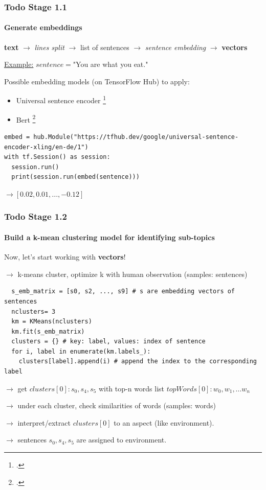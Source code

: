 \documentclass{tum-presentation}
\begin{document}
\begin{frame}[fragile]
  \frametitle{Todo Stage 1.1}
  \framesubtitle{Generate embeddings }

  \begin{description}
    \item \textbf{text}  $\to$ \textit{lines split}  $\to$ list of sentences $\to$ \textit{sentence embedding}  $\to$ \textbf{vectors}
   
    \pause 
    \vspace{0.2cm}
    \item \underline{Example:} $sentence=$"You are what you eat." 
    \vspace{0.2cm}
    \pause 
    \item Possible embedding models (on TensorFlow Hub) to apply:
    \begin{itemize}
      \item  Universal sentence encoder \footcite{chidambaram2018learning}
      \item  Bert \footcite{bertontfhub}
    \end{itemize}
    \pause 
  \begin{lstlisting}
embed = hub.Module("https://tfhub.dev/google/universal-sentence-encoder-xling/en-de/1")
with tf.Session() as session:
  session.run()
  print(session.run(embed(sentence)))
    \end{lstlisting}
    \item $ \to [0.02, 0.01, ..., -0.12]$
  \end{description}
\end{frame}

\begin{frame}[fragile]
  \frametitle{Todo Stage 1.2}
 \framesubtitle{Build a k-mean clustering model for identifying sub-topics}
 \begin{description}
  \item Now, let's start working with \textbf{vectors}! 

  \item $\to$ k-means cluster, optimize k with human observation \alert{(samples: sentences)}
  \pause 
  \begin{lstlisting}
  s_emb_matrix = [s0, s2, ..., s9] # s are embedding vectors of sentences
  nclusters= 3
  km = KMeans(nclusters)
  km.fit(s_emb_matrix)
  clusters = {} # key: label, values: index of sentence
  for i, label in enumerate(km.labels_):
    clusters[label].append(i) # append the index to the corresponding label
  \end{lstlisting}
  \pause 
    \item $\to$ get $clusters[0]:s_0,s_4,s_5$ with top-n words list $topWords[0]:w_0,w_1,...w_n$
    \pause 
    \item $\to$ under each cluster, check similarities of words  \alert{(samples: words)}
    \pause 
    \item $\to$ interpret/extract $clusters[0]$ to an aspect (like environment).
    \item  $\to$ sentences $s_0,s_4,s_5$ are assigned to environment.
  \end{description}

\end{frame}
\end{document}
